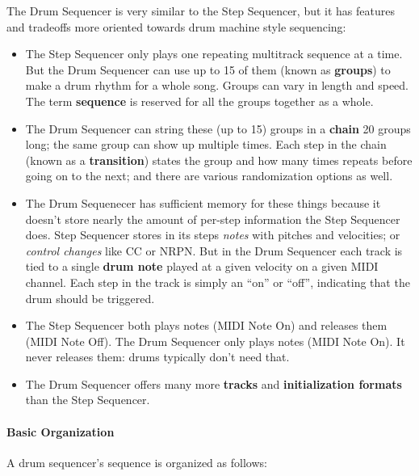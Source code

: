 \documentclass{article}
\begin{document}
The Drum Sequencer is very similar to the Step Sequencer, but it has features and tradeoffs more oriented towards drum machine style sequencing:

\begin{itemize}
\item The Step Sequencer only plays one repeating multitrack sequence at a time.   But the Drum Sequencer can use up to 15 of them (known as {\bf groups}) to make a drum rhythm for a whole song.  Groups can vary in length and speed.  The term {\bf sequence} is reserved for all the groups together as a whole.
\end{itemize}

\begin{itemize}
\item The Drum Sequencer can string these (up to 15) groups in a {\bf chain} 20 groups long; the same group can show up multiple times.  Each step in the chain (known as a {\bf transition}) states the group and how many times repeats before going on to the next; and there are various randomization options as well.
\item The Drum Sequenecer has sufficient memory for these things because it doesn't store nearly the amount of per-step information the Step Sequencer does. Step Sequencer stores in its steps {\it notes} with pitches and velocities; or {\it control changes} like CC or NRPN.  But in the Drum Sequencer each track is tied to a single {\bf drum note} played at a given velocity on a given MIDI channel.  Each step in the track is simply an ``on'' or ``off'', indicating that the drum should be triggered.
\item The Step Sequencer both plays notes (MIDI Note On) and releases them (MIDI Note Off).  The Drum Sequencer only plays notes (MIDI Note On).  It never releases them: drums typically don't need that.
\item The Drum Sequencer offers many more {\bf tracks} and {\bf initialization formats} than the Step Sequencer.
\end{itemize}

\paragraph{Basic Organization} A drum sequencer's sequence is organized as follows:
\end{document}
